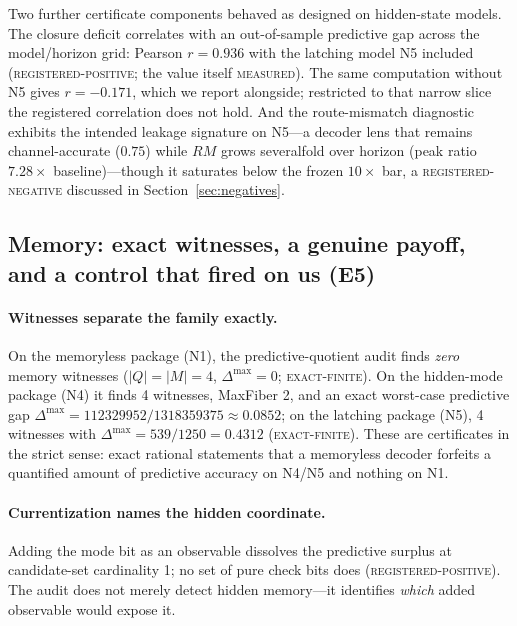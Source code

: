 \documentclass[11pt]{article}
\newcommand{\grade}[1]{\textsc{#1}}
\newcommand{\gExact}{\grade{exact-finite}}
\newcommand{\gMeasured}{\grade{measured}}
\newcommand{\gRegPos}{\grade{registered-positive}}
\newcommand{\gRegNeg}{\grade{registered-negative}}
\theoremstyle{definition}
\begin{document}
Two further certificate components behaved as designed on hidden-state models. The closure deficit correlates with an out-of-sample predictive gap across the model/horizon grid: Pearson $r = 0.936$ with the latching model N5 included (\gRegPos; the value itself \gMeasured). The same computation without N5 gives $r = -0.171$, which we report alongside; restricted to that narrow slice the registered correlation does not hold. And the route-mismatch diagnostic exhibits the intended leakage signature on N5---a decoder lens that remains channel-accurate ($0.75$) while $RM$ grows severalfold over horizon (peak ratio $7.28\times$ baseline)---though it saturates below the frozen $10\times$ bar, a \gRegNeg{} discussed in Section~\ref{sec:negatives}. 

\subsection{Memory: exact witnesses, a genuine payoff, and a control that fired on us (E5)}
\label{sec:results-memory}

\paragraph{Witnesses separate the family exactly.} On the memoryless package (N1), the predictive-quotient audit finds \emph{zero} memory witnesses ($|Q| = |M| = 4$, $\Delta^{\max} = 0$; \gExact). On the hidden-mode package (N4) it finds 4 witnesses, MaxFiber 2, and an exact worst-case predictive gap $\Delta^{\max} = 112329952/1318359375 \approx 0.0852$; on the latching package (N5), 4 witnesses with $\Delta^{\max} = 539/1250 = 0.4312$ (\gExact). These are certificates in the strict sense: exact rational statements that a memoryless decoder forfeits a quantified amount of predictive accuracy on N4/N5 and nothing on N1.

\paragraph{Currentization names the hidden coordinate.} Adding the mode bit as an observable dissolves the predictive surplus at candidate-set cardinality 1; no set of pure check bits does (\gRegPos). The audit does not merely detect hidden memory---it identifies \emph{which} added observable would expose it.
\end{document}
